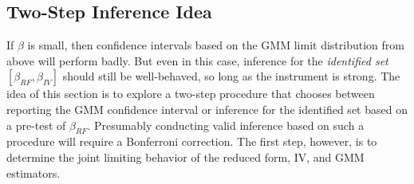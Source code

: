 \documentclass[12pt]{article}
\begin{document}
\subsection{Two-Step Inference Idea}
If $\beta$ is small, then confidence intervals based on the GMM limit distribution from above will perform badly.
But even in this case, inference for the \emph{identified set} $\left[ \beta_{RF}, \beta_{IV} \right]$ should still be well-behaved, so long as the instrument is strong.
The idea of this section is to explore a two-step procedure that chooses between reporting the GMM confidence interval or inference for the identified set based on a pre-test of $\beta_{RF}$.
Presumably conducting valid inference based on such a procedure will require a Bonferroni correction.
The first step, however, is to determine the joint limiting behavior of the reduced form, IV, and GMM estimators.
\end{document}
